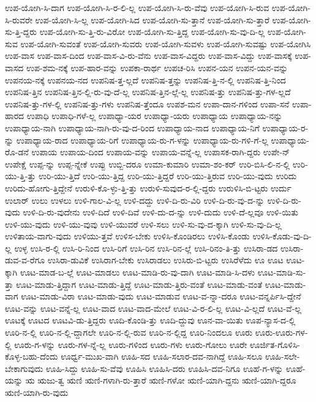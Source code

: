{ಉಪ-ಯೋಗಿ-ಸಿ-ದಾಗ
ಉಪ-ಯೋಗಿ-ಸಿ-ರ-ಲಿ-ಲ್ಲ
ಉಪ-ಯೋಗಿ-ಸಿ-ರು-ವೆವು
ಉಪ-ಯೋಗಿ-ಸಿ-ರುವ
ಉಪ-ಯೋಗಿ-ಸಿ-ರುವರೇ
ಉಪ-ಯೋಗಿ-ಸಿ-ಲ್ಲ
ಉಪ-ಯೋಗಿ-ಸಿದ
ಉಪ-ಯೋಗಿ-ಸು-ತ್ತಾನೆ
ಉಪ-ಯೋಗಿ-ಸು-ತ್ತಾರೆ
ಉಪ-ಯೋಗಿ-ಸು-ತ್ತಿ-ದ್ದರು
ಉಪ-ಯೋಗಿ-ಸು-ತ್ತಿ-ರು-ವಿರೋ
ಉಪ-ಯೋಗಿ-ಸು-ತ್ತಿದ್ದ
ಉಪ-ಯೋಗಿ-ಸು-ವು-ದಿ-ಲ್ಲ
ಉಪ-ಯೋಗಿ-ಸುವ
ಉಪ-ಯೋಗಿ-ಸುವಂತೆ
ಉಪ-ಯೋಗಿ-ಸುವರು
ಉಪ-ಯೋಗಿ-ಸುವಳು
ಉಪ-ಯೋಗಿ-ಸುವಷ್ಟು
ಉಪ-ಯೋಗಿಸಿ
ಉಪ-ವಾಸ
ಉಪ-ವಾಸ-ದಿಂದ
ಉಪ-ವಾಸ-ವಿ-ರು-ವೆನು
ಉಪ-ವಾಸ-ವಿದ್ದರು
ಉಪ-ವಾಸ-ವಿದ್ದು
ಉಪ-ವಾಸಕ್ಕೆ
ಉಪ-ವಾಸದ
ಉಪ-ಶಮ-ನಕ್ಕೆ
ಉಪ-ಹಾರ-ವನ್ನು
ಉಪಕಾ-ರಾರ್ಥ
ಉಪಚ-ರಿಸಿ
ಉಪನ-ಯನ
ಉಪನ-ಯನ-ವನ್ನು
ಉಪನಯ-ನಕ್ಕೆ
ಉಪನಯ-ನದ
ಉಪನಿಷ-ತ್ತ-ಲ್ಲದೆ
ಉಪನಿಷ-ತ್ತನ್ನು
ಉಪನಿಷ-ತ್ತಿ-ನ-ಲ್ಲಿ
ಉಪನಿಷ-ತ್ತಿ-ನಿಂದ
ಉಪನಿಷ-ತ್ತಿನ
ಉಪನಿಷ-ತ್ತಿನ-ಲ್ಲಿ-ರು-ವು-ದೆ-ಲ್ಲ
ಉಪನಿಷ-ತ್ತಿನ-ಲ್ಲೆ-ಲ್ಲ
ಉಪನಿಷ-ತ್ತು
ಉಪನಿಷ-ತ್ತು-ಗಳ-ಲ್ಲದೆ
ಉಪನಿಷ-ತ್ತು-ಗಳ-ಲ್ಲಿ
ಉಪನಿಷ-ತ್ತು-ಗಳು
ಉಪನಿಷ-ತ್ತೆಂದೂ
ಉಪಶ-ಮನ
ಉಪಾ-ದಾನ-ಗಳಿಂದ
ಉಪಾ-ಸನೆ
ಉಪಾ-ಹಾರದ
ಉಪಾಧಿ
ಉಪಾಧಿ-ಗಳೆ-ಲ್ಲ
ಉಪಾಧ್ಯಾ-ಯರ
ಉಪಾಧ್ಯಾ-ಯರು
ಉಪಾಧ್ಯಾಯ
ಉಪಾಧ್ಯಾಯ-ನನ್ನು
ಉಪಾಧ್ಯಾಯ-ನಾಗಿ
ಉಪಾಧ್ಯಾಯ-ನಾಗಿ-ರು-ವು-ದ-ರಿಂದ
ಉಪಾಧ್ಯಾಯ-ನಾದ
ಉಪಾಧ್ಯಾಯ-ನಿಗೆ
ಉಪಾಧ್ಯಾಯ-ರ-ನ್ನು
ಉಪಾಧ್ಯಾಯ-ರಾದ
ಉಪಾಧ್ಯಾಯ-ರಿಗೆ
ಉಪಾಧ್ಯಾಯ-ರು-ಗ-ಳನ್ನು
ಉಪಾಧ್ಯಾಯ-ರು-ಗಳಿ-ಗೆ-ಲ್ಲ
ಉಪಾಧ್ಯಾಯ-ರೊ-ಡನೆ
ಉಪಾಯ
ಉಪಾಯ-ದಿಂದ
ಉಪಾಯ-ವನ್ನು
ಉಪಾಯ-ವನ್ನೆ-ಲ್ಲ
ಉಪಾಸಕ-ರಾಗಿ-ದ್ದರು
ಉಪೇ-ನ್
ಉಪೇಕ್ಷೆ
ಉಪ್ಪ-ನ್ನು
ಉಪ್ಪ-ನ್ನೇಕೆ
ಉಪ್ಪು
ಉಬ್ಬಿ-ದರೂ
ಉಮಾ-ಕುಮಾರಿ
ಉಮಾ-ಶಂ-ಕರ್
ಉರಿ-ಬಿಸಿ-ಲಿ-ನ-ಲ್ಲಿ
ಉರಿ-ಯು-ತ್ತಿ-ತ್ತು
ಉರಿ-ಯು-ತ್ತಿದೆ
ಉರಿ-ಯು-ತ್ತಿದ್ದ
ಉರಿ-ಯು-ತ್ತಿದ್ದರೆ
ಉರಿ-ಯು-ತ್ತಿರುವ
ಉರಿ-ಯು-ವುದು
ಉರಿದು
ಉರಿದು-ಹೋಗು-ತ್ತಿದ್ದೇನೆ
ಉರುಳಿ-ಕೊ-ಳ್ಳು-ತ್ತಿ-ತ್ತು
ಉರುಳಿ-ಸುವುದ-ರ-ಲ್ಲಿ-ದ್ದರು
ಉರುಳಿಸಿ-ಬಿ-ಟ್ಟರು
ಉರ್ದು
ಉಲಾರ್
ಉಲು
ಉಳಲು
ಉಳಿ-ಗಾಲ-ವಿ-ಲ್ಲ
ಉಳಿ-ದದ್ದು
ಉಳಿ-ದಿ-ರು-ವಿರಿ
ಉಳಿ-ದಿ-ರು-ವು-ದ-ನ್ನು
ಉಳಿ-ದಿ-ರು-ವುದು
ಉಳಿ-ದಿ-ರು-ವುದೇನು
ಉಳಿ-ದಿದೆ
ಉಳಿ-ದಿವೆ
ಉಳಿ-ದು-ದ-ನ್ನು
ಉಳಿ-ದುದು
ಉಳಿ-ದೆ-ಲ್ಲವೂ
ಉಳಿ-ಯಿತು
ಉಳಿ-ಯು-ವುದು
ಉಳಿ-ಯು-ವುವು
ಉಳಿ-ಯುವರೆ
ಉಳಿ-ಸಲು
ಉಳಿ-ಸು-ವು-ದ-ಕ್ಕಾಗಿ
ಉಳಿ-ಸು-ವು-ದಿ-ಲ್ಲ
ಉಳಿತಾಯ-ವಾಗು-ವುದು
ಉಳಿಯು-ತ್ತವೆ
ಉಳಿಸ-ಬೇಕು
ಉಳಿಸಿ-ಕೊಂಡಿರಲು
ಉಳಿಸಿ-ಕೊಂಡು
ಉಳಿಸಿ-ಕೊಡು-ವು-ದಿ-ಲ್ಲ
ಉಳ್ಳ
ಉಸಿ-ರ-ಲ್ಲಿ
ಉಸಿ-ರಿ-ನಿಂದ
ಉಸಿ-ರಿಗೆ
ಉಸಿ-ರಿನ
ಉಸಿ-ರಿನ-ಲ್ಲೆ
ಉಸಿ-ರಿನಂ-ತಿ-ತ್ತು
ಉಸಿರಾ-ಡದ
ಉಸಿರಾ-ಡುವ-ವ-ರೆಗೂ
ಉಸಿರಾ-ಡುವಿಕೆ
ಉಸಿರಾಗ-ಬೇಕು
ಉಸಿರಾಡಲು
ಉಸಿರು-ಬಿ-ಟ್ಟರು
ಉಸಿರೆಳೆದು
ಊ
ಊಟ
ಊಟ-ಕ್ಕಾಗಿ
ಊಟ-ಮಾಡ-ಬ-ಲ್ಲೆ
ಊಟ-ಮಾಡಲು
ಊಟ-ಮಾಡಿ-ರು-ವು-ದಾಗಿ
ಊಟ-ಮಾಡಿ-ಸಿ-ದಳು
ಊಟ-ಮಾಡಿ-ಸು-ತ್ತಾ
ಊಟ-ಮಾಡು-ತ್ತಿದ್ದಾಗ
ಊಟ-ಮಾಡು-ತ್ತಿದ್ದೆ
ಊಟ-ಮಾಡು-ತ್ತಿರು-ವಂತೆ
ಊಟ-ಮಾಡು-ವಂತೆ
ಊಟ-ಮಾಡು-ವಾಗ
ಊಟ-ಮಾಡು-ವಿರಾ
ಊಟ-ಮಾಡು-ವುದು
ಊಟ-ಮಾಡುವ
ಊಟ-ವ-ನ್ನಾ-ದರೂ
ಊಟ-ವನ್ನರ್ಪಿಸಿ-ದ್ದೇನೆ
ಊಟ-ವನ್ನು
ಊಟ-ವನ್ನೆ-ಲ್ಲ
ಊಟ-ವಾದ
ಊಟ-ವಾದ-ಮೇಲೆ
ಊಟ-ವಿ-ರ-ಲಿ-ಲ್ಲ
ಊಟ-ವಿ-ಲ್ಲದೆ
ಊಟ-ವೆ-ಲ್ಲ
ಊಟಕ್ಕೆ
ಊಟದ
ಊಟವಿ-ಡು-ತ್ತಿದ್ದರು
ಊದಿ-ಕೊಂಡಿ-ತ್ತು
ಊದಿ-ದ್ದುವು
ಊನ-ವಾ-ಯಿತು
ಊಪ-ನ್ಯಾಸ-ದ-ಲ್ಲಿ
ಊರಿ-ನ-ಲ್ಲಿ
ಊರಿ-ನ-ಲ್ಲಿ-ದ್ದಾಗಲೇ
ಊರಿ-ನ-ಲ್ಲಿ-ರುವ
ಊರಿ-ನ-ಲ್ಲಿದ್ದ
ಊರಿ-ನಿಂದಲೂ
ಊರು
ಊರು-ಊರು-ಗಳ-ಲ್ಲಿ
ಊರು-ಗ-ಳನ್ನು
ಊರು-ಗಳ-ನ್ನೆ-ಲ್ಲ
ಊರು-ಗಳಿಂದ
ಊರು-ಗಳು
ಊರು-ಗೋಲು
ಊರೇ
ಊರ್ಜಿತ-ಗೊಳಿಸಿ-ಕೊಳ್ಳ-ಬಹು-ದೆಂದು
ಊರ್ಧ್ವ-ಮುಖ-ವಾಗಿ
ಊಹಿ-ಸದ
ಊಹಿ-ಸಲಾರ-ದವ-ನಾಗಿದ್ದೆ
ಊಹಿ-ಸಲೂ
ಊಹಿ-ಸಲೇ-ಬೇಕಾಗುವುದು
ಊಹಿ-ಸಿದ್ದು
ಊಹಿ-ಸು-ವೆವು
ಊಹಿಸಿ
ಊಹಿಸಿ-ದರು
ಊಹಿಸಿ-ದವ-ನಿಗೂ
ಊಹೆ-ಗ-ಳನ್ನು
ಊಹೆ-ಯನ್ನು
ಋ
ಋಜು-ತ್ವ
ಋಣಿ
ಋಣಿ-ಗಳಾಗಿ-ರು-ತ್ತಾರೆ
ಋಣಿ-ಗಳೋ
ಋಣಿ-ಯಾಗಿ-ದ್ದನು
ಋಣಿ-ಯಾಗಿ-ದ್ದರೂ
ಋಣಿ-ಯಾಗಿ-ರು-ವುದು
}
